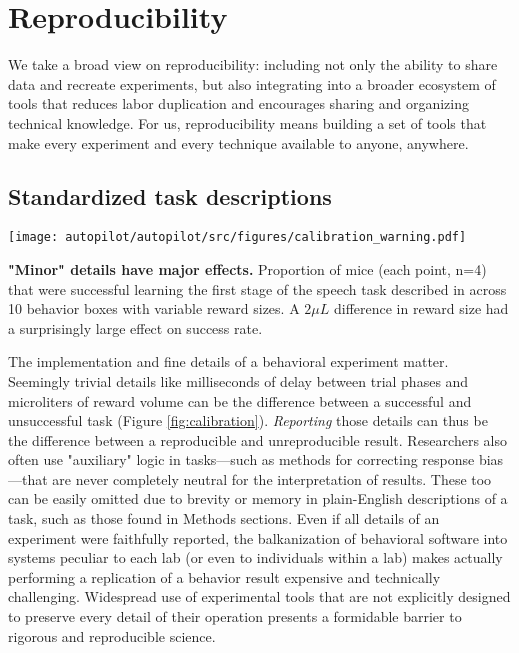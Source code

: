 \section{Reproducibility}
\label{sec:reproducibility}

We take a broad view on reproducibility: including not only the ability to share data and recreate experiments, but also integrating into a broader ecosystem of tools that reduces labor duplication and encourages sharing and organizing technical knowledge. For us, reproducibility means building a set of tools that make every experiment and every technique available to anyone, anywhere.

\subsection{Standardized task descriptions}

\begin{marginfigure}[-2cm]
\texttt{[image: autopilot/autopilot/src/figures/calibration\_warning.pdf]}
\caption{\textbf{"Minor" details have major effects.} Proportion of mice (each point, n=4) that were successful learning the first stage of the speech task described in \citep{saundersMiceCanLearn2019} across 10 behavior boxes with variable reward sizes. A $2 \mu L$ difference in reward size had a surprisingly large effect on success rate.}
\label{fig:calibration}
\end{marginfigure}

The implementation and fine details of a behavioral experiment matter. Seemingly trivial details like milliseconds of delay between trial phases and microliters of reward volume can be the difference between a successful and unsuccessful task (Figure \ref{fig:calibration}). \textit{Reporting} those details can thus be the difference between a reproducible and unreproducible result.  Researchers also often use "auxiliary" logic in tasks---such as methods for correcting response bias---that are never completely neutral for the interpretation of results. These too can be easily omitted due to brevity or memory in plain-English descriptions of a task, such as those found in Methods sections. Even if all details of an experiment were faithfully reported, the balkanization of behavioral software into systems peculiar to each lab (or even to individuals within a lab) makes actually performing a replication of a behavior result expensive and technically challenging. Widespread use of experimental tools that are not explicitly designed to preserve every detail of their operation presents a formidable barrier to rigorous and reproducible science\citep{wallReliabilityStartsExperimental2019}.


